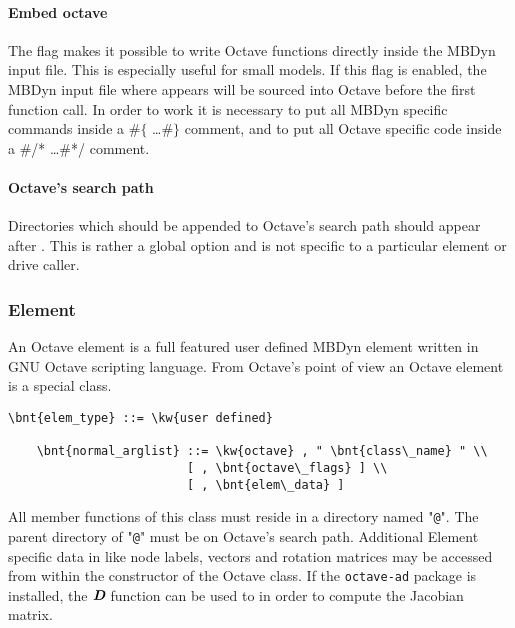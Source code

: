 \paragraph{Embed octave}
The flag  makes it possible to write Octave functions directly inside the MBDyn input file.
This is especially useful for small models. If this flag is enabled, the MBDyn input file where  appears will be sourced into Octave before the first function call.
In order to work it is necessary to put all MBDyn specific commands inside a $\#\lbrace$ \ldots $\#\rbrace$ comment, and to put all Octave specific code inside a \#/* \ldots \#*/ comment.

\paragraph{Octave's search path}
Directories which should be appended to Octave's search path should appear after .
This is rather a global option and is not specific to a particular element or drive caller.

\subsubsection{Element}
An Octave element is a full featured user defined MBDyn element written in GNU Octave scripting language.
From Octave's point of view an Octave element is a special class.
\begin{Verbatim}[commandchars=\\\{\}]
    \bnt{elem_type} ::= \kw{user defined}

    \bnt{normal_arglist} ::= \kw{octave} , " \bnt{class\_name} " \\
                         [ , \bnt{octave\_flags} ] \\
                         [ , \bnt{elem\_data} ]
\end{Verbatim}
All member functions of this class must reside in a directory named "\texttt{@}".
The parent directory of "\texttt{@}" must be on Octave's search path.
Additional Element specific data in  like node labels, vectors and rotation matrices may be accessed from within the constructor of the Octave class. If the \texttt{octave-ad} package is installed, the $\textit{\textbf{D}}$ function can be used to in order to compute the Jacobian matrix.

